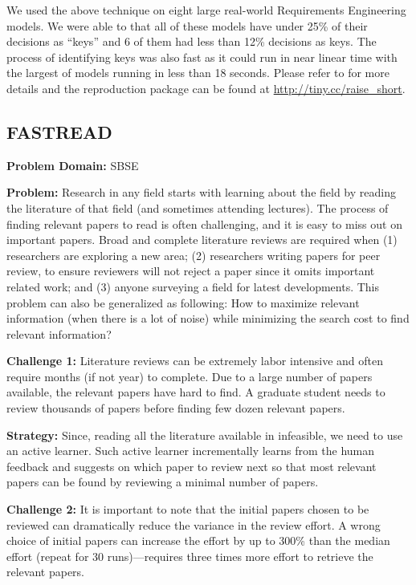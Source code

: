\documentclass[table, xcdraw, sigconf,review, anonymous]{acmart}
\begin{document}
We used the above technique on eight large real-world Requirements Engineering models. We were able to that all of these models have under 25\% of their decisions as ``keys'' and 6 of them had less than 12\% decisions as keys. The process of identifying keys was also fast as it could run in near linear time with the largest of models running in less than 18 seconds. Please refer to \cite{mathew2017shorter} for more details and the reproduction package can be found at \url{http://tiny.cc/raise_short}.

\subsection{FASTREAD}
\noindent\textbf{Problem Domain: } SBSE

\noindent\textbf{Problem: }
Research in any field starts with learning about the field by reading the literature of that field (and sometimes attending lectures). The process of finding relevant papers to read is often challenging, and it is easy to miss out on important papers. Broad and complete literature reviews are required when (1) researchers are exploring a new area; (2) researchers writing papers for peer review, to ensure reviewers will not reject a paper since it omits important related work; and (3) anyone surveying a field for latest developments. This problem can also be generalized as following: How to maximize relevant information (when there is a lot of noise) while minimizing the search cost to find relevant information?
   
\vspace{1.0ex}
\noindent\textbf{Challenge 1: }
Literature reviews can be extremely labor intensive and often require months (if not year) to complete. Due to a large number of papers available, the relevant papers have hard to find. A graduate student needs to review thousands of papers before finding few dozen relevant papers. 

\noindent\textbf{Strategy: }
   Since, reading all the literature available in infeasible, we need to use an active learner. Such active learner incrementally learns from the human feedback and suggests on which paper to review next so that most relevant papers can be found by reviewing a minimal number of papers.
   
\vspace{1.0ex}
\noindent\textbf{Challenge 2: }
It is important to note that the initial papers chosen to be reviewed can dramatically reduce the variance in the review effort. A wrong choice of initial papers can increase the effort by up to 300\% than the median effort (repeat for 30 runs)---requires three times more effort to retrieve the relevant papers. 
\end{document}
